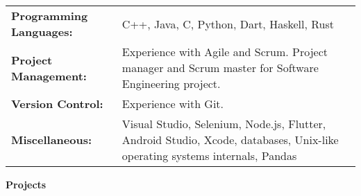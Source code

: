 \documentclass[a4paper]{article}
\newcommand{\lineunder} {
    \vspace*{-8pt} \\
    \hspace*{-18pt} \hrulefill \\
}
\newcommand{\header} [1] {
    {\hspace*{-18pt}\vspace*{6pt}\LARGE \textbf{#1}}
    \vspace*{-6pt} \lineunder
}
\begin{document}
\def\arraystretch{1.25}
\begin{tabular}{ l p{.69\linewidth} }
	\hspace*{-3.28mm} \textbf{Programming Languages:} & C++, Java, C, Python, Dart, Haskell, Rust                                                                                \\
	\hspace*{-3.28mm} \textbf{Project Management:}   & Experience with Agile and Scrum. Project manager and Scrum master for Software Engineering project. \\
	\hspace*{-3.28mm} \textbf{Version Control:}       & Experience with Git.\\
    \hspace*{-3.28mm} \textbf{Miscellaneous:}       & Visual Studio, Selenium, Node.js, Flutter, Android Studio, Xcode, databases, Unix-like operating systems internals, Pandas                                                                                            \\
\end{tabular}
\vspace{2mm}

\header{Projects}
\vspace{1mm}


\end{document}
